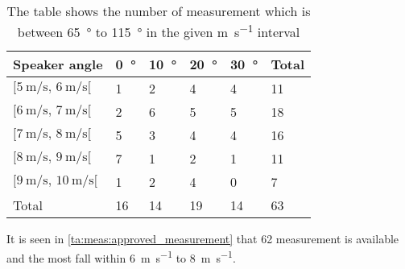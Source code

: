 \begin{table}[H]
\centering
\caption{The table shows the number of measurement which is between \SI{65}{\degree} to \SI{115}{\degree} in the given \si{\meter\per\second} interval}
\begin{tabular}{l|l|l|l|l|l}
Speaker angle & \SI{0}{\degree}  & \SI{10}{\degree} & \SI{20}{\degree} & \SI{30}{\degree} & Total \\ \hline
$[\SI{5}{\meter\per\second},\, \SI{6}{\meter\per\second}[ $         & 1  & 2  & 4  & 4  & 11    \\
$[\SI{6}{\meter\per\second},\, \SI{7}{\meter\per\second}[$           & 2  & 6  & 5  & 5  & 18    \\
$[\SI{7}{\meter\per\second},\, \SI{8}{\meter\per\second}[ $          & 5  & 3  & 4  & 4  & 16    \\
$[\SI{8}{\meter\per\second},\, \SI{9}{\meter\per\second}[ $          & 7  & 1  & 2  & 1  & 11    \\
$[\SI{9}{\meter\per\second},\, \SI{10}{\meter\per\second}[  $        & 1  & 2  & 4  & 0  & 7     \\ \hline
Total         & 16 & 14 & 19 & 14 &   63   
\end{tabular}
\label{ta:meas:approved_measurement}
\end{table}

It is seen in \autoref{ta:meas:approved_measurement} that 62 measurement is available and the most fall within \SI{6}{\meter\per\second} to \SI{8}{\meter\per\second}.





